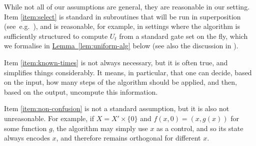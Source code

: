 \documentclass{theoretics}
\newcommand{\lem}[1]{\hyperref[lem:#1]{Lemma~\ref*{lem:#1}}}
\renewcommand{\>}{\rangle}
\newcommand{\<}{\langle}
\renewcommand{\(}{\left(}
\renewcommand{\)}{\right)}
\begin{document}
While not all of our assumptions are general, they are reasonable in our setting. Item \ref{item:select} is standard in subroutines that will be run in superposition (see~e.g.~\cite{ambainis2010VTSearch}), and is reasonable, for example, in settings where the algorithm is sufficiently structured to compute $U_t$ from a standard gate set on the fly, which we formalise in \lem{uniform-alg} below (see also the discussion in \cite[Section 2.2]{cornelissen2020SpanProgramTime}). 

Item \ref{item:known-times} is not always necessary, but it is often true, and simplifies things considerably. It means, in particular, that one can decide, based on the input, how many steps of the algorithm should be applied, and then, based on the output, uncompute this information.

Item \ref{item:non-confusion}
is not a standard assumption, but it is also not unreasonable. For example, if 
$X=X'\times\{0\}$ and $f(x,0)=(x,g(x))$ for some function $g$, the algorithm may simply use $x$ as a control, and so its state always encodes $x$, and therefore remains orthogonal for different $x$. 
\end{document}
